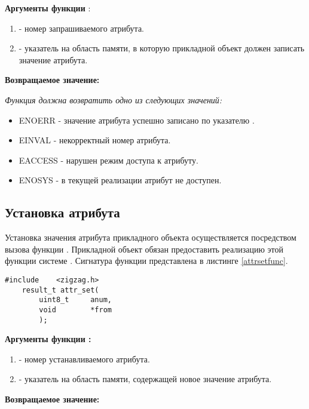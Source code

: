 {\bfseries Аргументы функции }:

{\itshape
\begin{enumerate}
\item {} - номер запрашиваемого атрибута.
\item {} - указатель на область памяти, в которую прикладной объект должен записать значение атрибута.
\end{enumerate}
}

{\bfseries Возвращаемое значение:}

{\itshape
Функция  должна возвратить одно из следующих значений:
\begin{itemize}
\item ENOERR - значение атрибута успешно записано по указателю .
\item EINVAL - некорректный номер атрибута.
\item EACCESS - нарушен режим доступа к атрибуту.
\item ENOSYS - в текущей реализации атрибут не доступен.
\end{itemize}
}

\subsection{Установка атрибута}

Установка значения атрибута прикладного объекта осуществляется посредством вызова функции . 
Прикладной объект обязан предоставить реализацию этой функции системе \zigzag. Сигнатура функции представлена
в листинге \ref{attrsetfunc}.

\begin{lstlisting}[caption=Функция \myfunc{attr\_set()} - установка атрибута. , label=attrsetfunc ]
    #include    <zigzag.h>
    result_t attr_set(
        uint8_t     anum,
        void        *from
        );
\end{lstlisting}

{\bfseries Аргументы функции :}

{\itshape
\begin{enumerate}
\item {} - номер устанавливаемого атрибута.
\item {} - указатель на область памяти, содержащей новое значение атрибута.
\end{enumerate}
}

{\bfseries Возвращаемое значение:}

